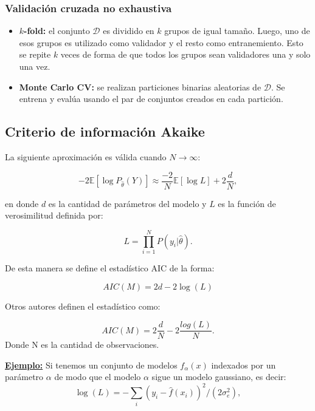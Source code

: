 \subsubsection{Validación cruzada no exhaustiva}

\begin{itemize}
	\item \textbf{$k$-fold:} el conjunto $\mathcal{D}$ es dividido en $k$ grupos de igual tamaño. Luego, uno de esos grupos es utilizado como validador y el resto como entranemiento. Esto se repite $k$ veces de forma de que todos los grupos sean validadores una y solo una vez.
	\item \textbf{Monte Carlo CV:} se realizan particiones binarias aleatorias de $\mathcal{D}$. Se entrena y evalúa usando el par de conjuntos creados en cada partición.
\end{itemize}

\subsection{Criterio de información Akaike}
La siguiente aproximación es válida cuando $N \to \infty$:

\begin{equation}
-2\mathbb{E}[\log P_{\hat{\theta}}(Y)] \approx \frac{-2}{N}\mathbb{E}[\log L] + 2\frac{d}{N},
\end{equation}

en donde $d$ es la cantidad de parámetros del modelo y  $L$ es la función de verosimilitud definida por:

\begin{equation}
L = \prod_{i=1}^N P(y_i|\hat{\theta}).
\end{equation}

De esta manera se define el estadístico AIC de la forma:

\begin{equation}
AIC(M) = 2d-2\log(L)
\end{equation}

Otros autores definen el estadístico como:

\begin{equation}
AIC(M) = 2\frac{d}{N}-2\frac{log(L)}{N}.
\end{equation}
Donde N es la cantidad de observaciones.

\textbf{\underline{Ejemplo:}} Si tenemos un conjunto de modelos $f_{\alpha}(x)$ indexados por un parámetro $\alpha$ de modo que el modelo $\alpha$ sigue un modelo gaussiano, es decir:
$$
\log(L) = -\sum_{i}(y_i-\hat{f}(x_i))^2/(2\sigma_e^2),
$$

